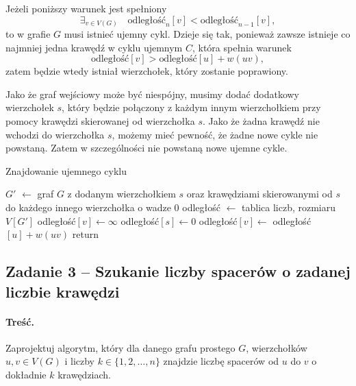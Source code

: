Jeżeli poniższy warunek jest spełniony
\[\exists_{v\in V(G)}\quad \text{odległość}_n[v] < \text{odległość}_{n-1}[v],\]
to w grafie $G$ musi istnieć ujemny cykl. Dzieje się 
tak, ponieważ zawsze istnieje co najmniej jedna krawędź 
w cyklu ujemnym $C$, która spełnia warunek 
\[\text{odległość}[v] > \text{odległość}[u] + w(uv),\]
zatem będzie wtedy istniał wierzchołek, który zostanie 
poprawiony.

Jako że graf wejściowy może być niespójny,
musimy dodać dodatkowy wierzchołek $s$, który
będzie połączony z każdym innym wierzchołkiem
przy pomocy krawędzi skierowanej od wierzchołka $s$. Jako
że żadna krawędź nie wchodzi do wierzchołka $s$, możemy mieć pewność,
że żadne nowe cykle nie powstaną. Zatem
w szczególności nie powstaną nowe
ujemne cykle.

\begin{algorithm}[H]
	\caption{Znajdowanie ujemnego cyklu}
	\begin{algorithmic}[1]
		\State $G'$ $\gets$ graf $G$ z dodanym wierzchołkiem $s$
		oraz krawędziami skierowanymi od $s$ do każdego innego
		wierzchołka o wadze $0$
		\State odległość $\gets$ tablica liczb, rozmiaru $V[G']$
		\State odległość$[v]\gets\infty$
		\EndFor
		\State odległość$[s]\gets0$
		\State odległość$[v]\gets$ odległość$[u] + w(uv)$ 
		\EndIf
		\EndFor
		\EndFor
		\State return \true
		\EndIf
		\EndFor
		\State \Return \false
		\EndProcedure
	\end{algorithmic}
	\label{Zadanie32}
\end{algorithm}

\subsection{Zadanie 3 -- Szukanie liczby spacerów o zadanej liczbie krawędzi}
\paragraph{Treść.}
Zaprojektuj algorytm, który dla danego grafu prostego 
$G$, wierzchołków $u, v \in V(G)$ i liczby $k \in
\{1, 2, \ldots , n\}$ znajdzie liczbę spacerów 
od $u$ do $v$ o dokładnie $k$ krawędziach.


